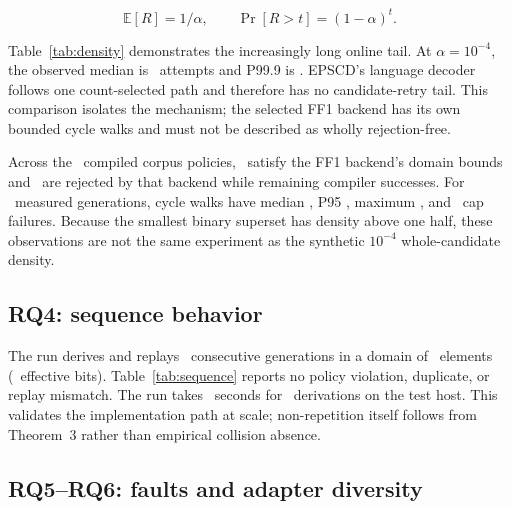 \documentclass[preprint,12pt]{elsarticle}
\begin{document}
\[
 \mathbb{E}[R]=1/\alpha,\qquad
 \Pr[R>t]=(1-\alpha)^t.
\]

\begin{table}[t]
\centering
\caption{Whole-candidate rejection retries, 2,000 accepted outputs per density.}
\label{tab:density}

\end{table}

Table~\ref{tab:density} demonstrates the increasingly long online tail. At
$\alpha=10^{-4}$, the observed median is \SparseMedianRetries\ attempts and
P99.9 is \SparseNinetyNinthNineRetries.
EPSCD's language decoder follows one count-selected path and therefore has no
candidate-retry tail. This comparison isolates the mechanism; the selected FF1
backend has its own bounded cycle walks and must not be described as wholly
rejection-free.

Across the \CorpusCompiled\ compiled corpus policies, \PermutationEligible\
satisfy the FF1 backend's domain bounds and \PermutationIneligible\ are rejected
by that backend while remaining compiler successes. For \PermutationSamples\
measured generations, cycle walks have median \PermutationMedianWalks, P95
\PermutationNinetyFifthWalks, maximum \PermutationMaxWalks, and
\PermutationCapHits\ cap failures. Because the smallest binary superset has density above
one half, these observations are not the same experiment as the synthetic
$10^{-4}$ whole-candidate density.

\subsection{RQ4: sequence behavior}

\begin{table}[t]
\centering
\caption{Scheme-v2 long-sequence implementation check.}
\label{tab:sequence}

\end{table}

The run derives and replays \SequenceCount\ consecutive generations in a domain
of \SequenceDomain\ elements (\SequenceBits\ effective bits).
Table~\ref{tab:sequence} reports no policy violation, duplicate, or replay
mismatch. The run takes \SequenceSeconds\ seconds for \SequenceCalls\
derivations on the test host.
This validates the implementation path at scale; non-repetition itself follows
from Theorem~3 rather than empirical collision absence.

\subsection{RQ5--RQ6: faults and adapter diversity}
\end{document}
